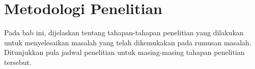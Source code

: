 \chapter{Metodologi Penelitian}
Pada bab ini, dijelaskan tentang tahapan-tahapan penelitian yang dilakukan untuk menyelesaikan masalah yang telah dikemukakan pada rumusan masalah. Ditunjukkan pula jadwal penelitian untuk masing-masing tahapan penelitian tersebut.









